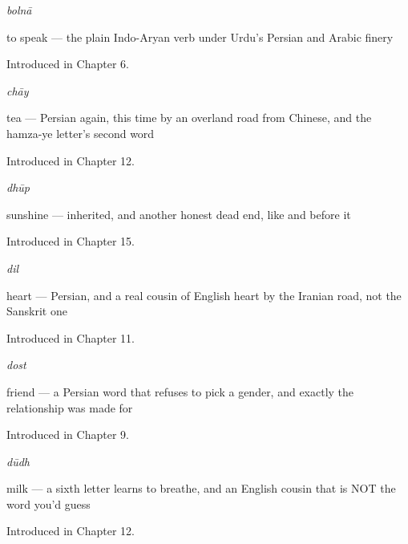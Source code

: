 \noindent\begin{minipage}[t]{\linewidth}
\raggedright
\textbf{}\enspace\emph{bolnā}\par
\small to speak — the plain Indo-Aryan verb under Urdu's Persian and Arabic finery\par
\footnotesize Introduced in Chapter 6.
\end{minipage}\par\medskip

\noindent\begin{minipage}[t]{\linewidth}
\raggedright
\textbf{}\enspace\emph{chāy}\par
\small tea — Persian again, this time by an overland road from Chinese, and the hamza-ye letter's second word\par
\footnotesize Introduced in Chapter 12.
\end{minipage}\par\medskip

\noindent\begin{minipage}[t]{\linewidth}
\raggedright
\textbf{}\enspace\emph{dhūp}\par
\small sunshine — inherited, and another honest dead end, like  and  before it\par
\footnotesize Introduced in Chapter 15.
\end{minipage}\par\medskip

\noindent\begin{minipage}[t]{\linewidth}
\raggedright
\textbf{}\enspace\emph{dil}\par
\small heart — Persian, and a real cousin of English heart by the Iranian road, not the Sanskrit one\par
\footnotesize Introduced in Chapter 11.
\end{minipage}\par\medskip

\noindent\begin{minipage}[t]{\linewidth}
\raggedright
\textbf{}\enspace\emph{dost}\par
\small friend — a Persian word that refuses to pick a gender, and exactly the relationship  was made for\par
\footnotesize Introduced in Chapter 9.
\end{minipage}\par\medskip

\noindent\begin{minipage}[t]{\linewidth}
\raggedright
\textbf{}\enspace\emph{dūdh}\par
\small milk — a sixth letter learns to breathe, and an English cousin that is NOT the word you'd guess\par
\footnotesize Introduced in Chapter 12.
\end{minipage}\par\medskip

